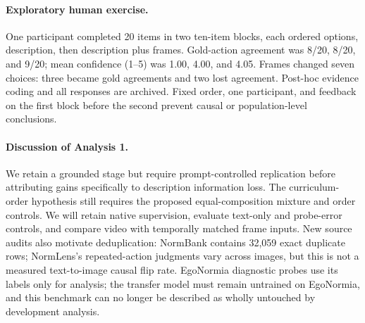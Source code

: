 \paragraph{Exploratory human exercise.}
One participant completed 20 items in two ten-item blocks, each ordered options, description, then description plus frames. Gold-action agreement was 8/20, 8/20, and 9/20; mean confidence (1--5) was 1.00, 4.00, and 4.05. Frames changed seven choices: three became gold agreements and two lost agreement. Post-hoc evidence coding and all responses are archived. Fixed order, one participant, and feedback on the first block before the second prevent causal or population-level conclusions.

\paragraph{Discussion of Analysis 1.}
We retain a grounded stage but require prompt-controlled replication before attributing gains specifically to description information loss. The curriculum-order hypothesis still requires the proposed equal-composition mixture and order controls. We will retain native supervision, evaluate text-only and probe-error controls, and compare video with temporally matched frame inputs. New source audits also motivate deduplication: NormBank contains 32,059 exact duplicate rows; NormLens's repeated-action judgments vary across images, but this is not a measured text-to-image causal flip rate. EgoNormia diagnostic probes use its labels only for analysis; the transfer model must remain untrained on EgoNormia, and this benchmark can no longer be described as wholly untouched by development analysis.
